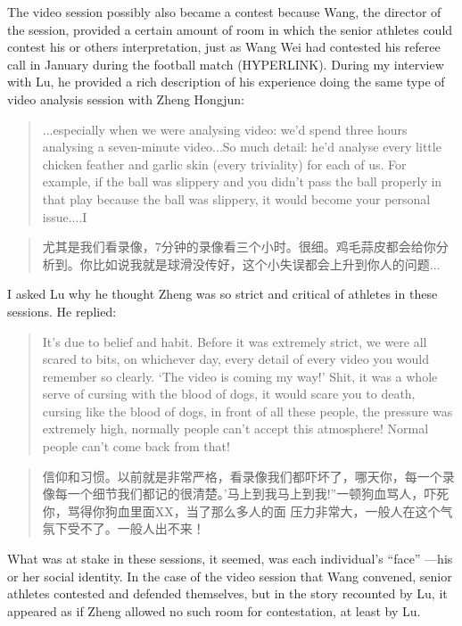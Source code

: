 \begin{CJK}{UTF8}{gbsn}
The video session possibly also became a contest because Wang, the director of the session, provided a certain amount of room in which the senior athletes could contest his or others interpretation, just as Wang Wei had contested his referee call in January during the football match (HYPERLINK). During my interview with Lu, he provided a rich description of his experience doing the same type of video analysis session with Zheng Hongjun:

\begin{quotation}
  ...especially when we were analysing video: we'd spend three hours analysing a seven-minute video...So much detail: he'd analyse every little chicken feather and garlic skin (every triviality) for each of us. For example, if the ball was slippery and you didn't pass the ball properly in that play because the ball was slippery, it would become your personal issue....I
\end{quotation}


\begin{quotation}
    尤其是我们看录像，7分钟的录像看三个小时。很细。鸡毛蒜皮都会给你分析到。你比如说我就是球滑没传好，这个小失误都会上升到你人的问题...
\end{quotation}



I asked Lu why he thought Zheng was so strict and critical of athletes in these sessions.  He replied:

\begin{quotation}
    It's due to belief and habit. Before it was extremely strict, we were all scared to bits, on whichever day, every detail of every video you would remember so clearly. `The video is coming my way!'  Shit, it was a whole serve of cursing with the blood of dogs, it would scare you to death, cursing like the blood of dogs, in front of all these people, the pressure was extremely high, normally people can’t accept this atmosphere! Normal people can’t come back from that!
\end{quotation}


  \begin{quotation}
      信仰和习惯。以前就是非常严格，看录像我们都吓坏了，哪天你，每一个录像每一个细节我们都记的很清楚。'马上到我马上到我!''一顿狗血骂人，吓死你，骂得你狗血里面XX，当了那么多人的面 压力非常大，一般人在这个气氛下受不了。一般人出不来！
  \end{quotation}


What was at stake in these sessions, it seemed, was each individual's ``face'' ---his or her social identity.  In the case of the video session that Wang convened, senior athletes contested and defended themselves, but in the story recounted by Lu, it appeared as if Zheng allowed no such room for contestation, at least by Lu.




\end{CJK}
